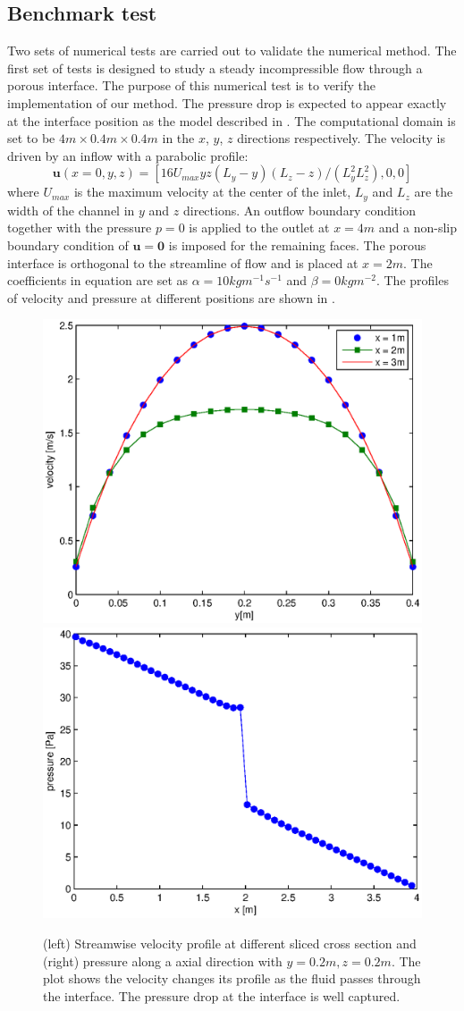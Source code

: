 \subsection{Benchmark test}
Two sets of numerical tests are carried out to validate the numerical method.
The first set of tests is designed to study a steady incompressible flow
through a porous interface. The purpose of this numerical test is to verify the
implementation of our method. The pressure drop is expected to appear exactly
at the interface position as the model described in .  The
computational domain is set to be $4m\times 0.4m\times 0.4m$ in the $x$, $y$,
$z$ directions respectively. The velocity is driven by an inflow with a
parabolic profile:
\begin{equation}
\mathbf{u}(x=0,y,z) = [16U_{max}yz(L_y - y)(L_z - z)/(L^2_yL^2_z),0,0]
\end{equation}
where $U_{max}$ is the maximum velocity at the center of the inlet, $L_y$ and
$L_z$ are the width of the channel in $y$ and $z$ directions.  An outflow
boundary condition together with the pressure $p = 0$ is applied to the outlet
at $x = 4m$ and a non-slip boundary condition of $\mathbf{u} = \mathbf{0}$ is
imposed for the remaining faces. The porous interface is orthogonal to the
streamline of flow and is placed at $x = 2m$. The coefficients in equation
 are set as $\alpha = 10 kgm^{-1}s^{-1}$ and $\beta = 0kgm^{-2}$.
The profiles of velocity and pressure at different positions are shown in
.

\begin{figure}[h] \centering
\includegraphics[width=0.49\columnwidth]{Figures/ucrs_profile}
\includegraphics[width=0.49\columnwidth]{Figures/p_profile} \caption{(left)
Streamwise velocity profile at different sliced cross section and
(right) pressure along a axial direction with $y = 0.2m, z = 0.2m$. The plot
shows the velocity changes its profile as the fluid passes through the interface.
The pressure drop at the interface is well captured.}
\label{fig:test1_profile}
\end{figure}

